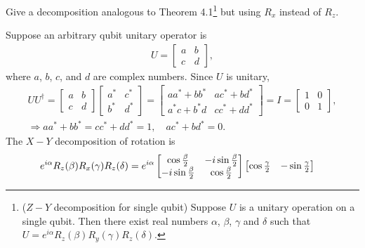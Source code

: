 \documentclass[en]{sol-man}
\begin{document}
\begin{exe}
    Give a decomposition analogous to Theorem 4.1\footnote{($Z-Y$ decomposition for single qubit) Suppose $U$ is a unitary operation on a single qubit. Then there exist real numbers $\alpha$, $\beta$, $\gamma$ and $\delta$ such that $U=e^{i\alpha}R_z(\beta)R_y(\gamma)R_z(\delta)$.\label{Thm-4.1-Z-Y-decomp-for-a-single-qubit}} but using $R_x$ instead of $R_z$.
\end{exe}
\begin{sol}
    Suppose an arbitrary qubit unitary operator is
    \begin{align}
        U=\begin{bmatrix}
            a&b\\
            c&d
        \end{bmatrix},
    \end{align}
    where $a$, $b$, $c$, and $d$ are complex numbers. Since $U$ is unitary,
    \begin{gather}
        UU^{\dagger}=\begin{bmatrix}
            a&b\\
            c&d
        \end{bmatrix}\begin{bmatrix}
            a^*&c^*\\
            b^*&d^*
        \end{bmatrix}=\begin{bmatrix}
            aa^*+bb^*&ac^*+bd^*\\
            a^*c+b^*d&cc^*+dd^*
        \end{bmatrix}=I=\begin{bmatrix}
            1&0\\
            0&1
        \end{bmatrix},\\
        \Longrightarrow aa^*+bb^*=cc^*+dd^*=1,\quad ac^*+bd^*=0.
    \end{gather}
    The $X-Y$ decomposition of rotation is
    \begin{align}
        \notag&e^{i\alpha}R_z(\beta)R_x(\gamma)R_z(\delta)=e^{i\alpha}\begin{bmatrix}
            \cos\frac{\beta}{2}&-i\sin\frac{\beta}{2}\\
            -i\sin\frac{\beta}{2}&\cos\frac{\beta}{2}
        \end{bmatrix}\begin{bmatrix}
            \cos\frac{\gamma}{2}&-\sin\frac{\gamma}{2}\\

\end{bmatrix}
\end{align}
\end{sol}
\end{document}
